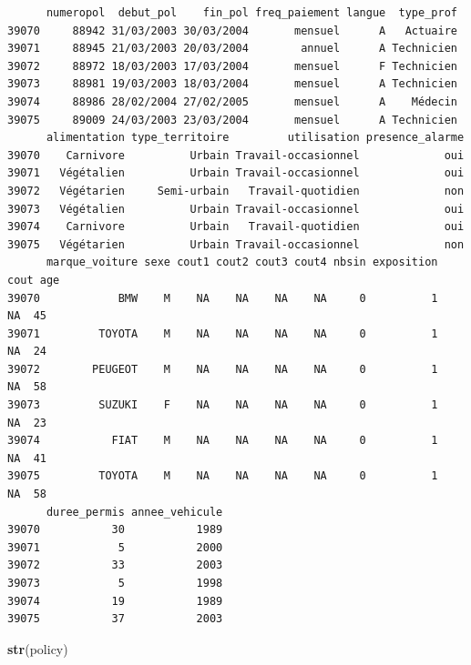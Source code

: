 \documentclass[
]{book}
\newenvironment{Shaded}{\begin{snugshade}}{\end{snugshade}}
\newcommand{\KeywordTok}[1]{\textcolor[rgb]{0.13,0.29,0.53}{\textbf{#1}}}
\newcommand{\NormalTok}[1]{#1}
\begin{document}
\begin{verbatim}
      numeropol  debut_pol    fin_pol freq_paiement langue  type_prof
39070     88942 31/03/2003 30/03/2004       mensuel      A   Actuaire
39071     88945 21/03/2003 20/03/2004        annuel      A Technicien
39072     88972 18/03/2003 17/03/2004       mensuel      F Technicien
39073     88981 19/03/2003 18/03/2004       mensuel      A Technicien
39074     88986 28/02/2004 27/02/2005       mensuel      A    Médecin
39075     89009 24/03/2003 23/03/2004       mensuel      A Technicien
      alimentation type_territoire         utilisation presence_alarme
39070    Carnivore          Urbain Travail-occasionnel             oui
39071   Végétalien          Urbain Travail-occasionnel             oui
39072   Végétarien     Semi-urbain   Travail-quotidien             non
39073   Végétalien          Urbain Travail-occasionnel             oui
39074    Carnivore          Urbain   Travail-quotidien             oui
39075   Végétarien          Urbain Travail-occasionnel             non
      marque_voiture sexe cout1 cout2 cout3 cout4 nbsin exposition cout age
39070            BMW    M    NA    NA    NA    NA     0          1   NA  45
39071         TOYOTA    M    NA    NA    NA    NA     0          1   NA  24
39072        PEUGEOT    M    NA    NA    NA    NA     0          1   NA  58
39073         SUZUKI    F    NA    NA    NA    NA     0          1   NA  23
39074           FIAT    M    NA    NA    NA    NA     0          1   NA  41
39075         TOYOTA    M    NA    NA    NA    NA     0          1   NA  58
      duree_permis annee_vehicule
39070           30           1989
39071            5           2000
39072           33           2003
39073            5           1998
39074           19           1989
39075           37           2003
\end{verbatim}

\begin{Shaded}
\begin{Highlighting}[]
\KeywordTok{str}\NormalTok{(policy)}
\end{Highlighting}
\end{Shaded}
\end{document}
